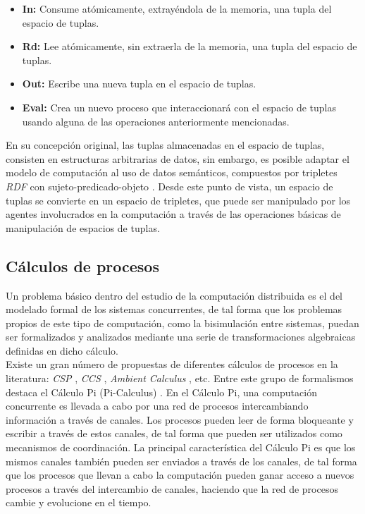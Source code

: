 \begin{itemize}

\item \textbf{In:} Consume at\'omicamente, extray\'endola de la memoria, una tupla del espacio de tuplas.
\item \textbf{Rd:} Lee at\'omicamente, sin extraerla de la memoria, una tupla del espacio de tuplas.
\item \textbf{Out:} Escribe una nueva tupla en el espacio de tuplas.
\item \textbf{Eval:} Crea un nuevo proceso que interaccionar\'a con el espacio de tuplas usando alguna de las operaciones anteriormente mencionadas.

\end{itemize}

En su concepci\'on original, las tuplas almacenadas en el espacio de tuplas, consisten en estructuras arbitrarias de datos, sin embargo, es posible adaptar el modelo de computaci\'on al uso de datos sem\'anticos, compuestos por tripletes \textit{RDF} con sujeto-predicado-objeto \cite{fensel2004triple}. Desde este punto de vista, un espacio de tuplas se convierte en un espacio de tripletes, que puede ser manipulado por los agentes involucrados en la computaci\'on a trav\'es de las operaciones b\'asicas de manipulaci\'on de espacios de tuplas.

\subsection{C\'alculos de procesos}

Un problema b\'asico dentro del estudio de la computaci\'on distribuida es el del modelado formal de los sistemas concurrentes, de tal forma que los problemas propios de este tipo de computaci\'on, como la bisimulaci\'on entre sistemas,  puedan ser formalizados y analizados mediante una serie de transformaciones algebraicas definidas en dicho c\'alculo.\\
Existe un gran n\'umero de propuestas de diferentes c\'alculos de procesos en la literatura: \textit{CSP} \cite{csp}, \textit{CCS} \cite{ccs}, \textit{Ambient Calculus} \cite{ambient_calculus}, etc. Entre este grupo de formalismos destaca el C\'alculo Pi (Pi-Calculus) \cite{pi_calculus}. En el C\'alculo Pi, una computaci\'on concurrente es llevada a cabo por una red de procesos intercambiando informaci\'on a trav\'es de canales. Los procesos pueden leer de forma bloqueante y escribir a trav\'es de estos canales, de tal forma que pueden ser utilizados como mecanismos de coordinaci\'on. La principal caracter\'istica del C\'alculo Pi es que los mismos canales tambi\'en pueden ser enviados a trav\'es de los canales, de tal forma que los procesos que llevan a cabo la computaci\'on pueden ganar acceso a nuevos procesos a trav\'es del intercambio de canales, haciendo que la red de procesos cambie y evolucione en el tiempo.\\

